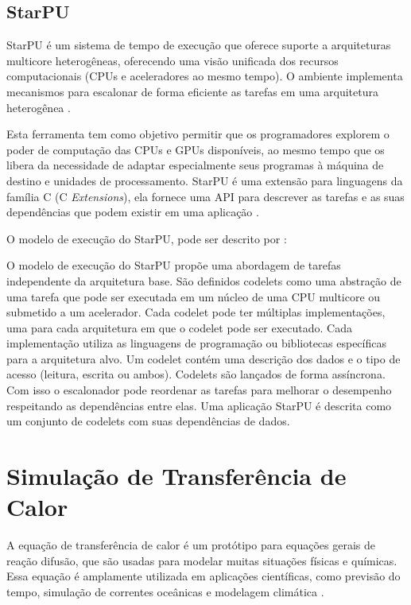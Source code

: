 \subsection{StarPU}
StarPU é um sistema de tempo de execução que oferece suporte a arquiteturas multicore heterogêneas, oferecendo uma visão unificada dos recursos computacionais (CPUs e aceleradores ao mesmo tempo).
O ambiente implementa mecanismos para escalonar de forma eficiente as tarefas em uma arquitetura heterogênea \cite{augonnet2011scheduling}. 

Esta ferramenta tem como objetivo permitir que os programadores explorem o poder de computação das CPUs e GPUs disponíveis, ao mesmo tempo que os libera da necessidade de adaptar especialmente seus programas à máquina de destino e unidades de processamento.
StarPU é uma extensão para linguagens da família C (C \textit{Extensions}), ela fornece uma API para descrever as tarefas e as suas dependências que podem existir em uma aplicação \cite{augonnet2011scheduling}.

\newpage

O modelo de execução do StarPU, pode ser descrito por :

\begin{citacao}
O modelo de execução do StarPU propõe uma abordagem de tarefas independente da arquitetura base.
São definidos codelets como uma abstração de uma tarefa que pode ser executada em um núcleo de uma CPU multicore ou submetido a um acelerador.
Cada codelet pode ter múltiplas implementações, uma para cada arquitetura em que o codelet pode ser executado.
Cada implementação utiliza as linguagens de programação ou bibliotecas específicas para a arquitetura alvo.
Um codelet contém uma descrição dos dados e o tipo de acesso (leitura, escrita ou ambos).
Codelets são lançados de forma assíncrona. Com isso o escalonador pode reordenar as tarefas para melhorar o desempenho respeitando as dependências entre elas.
Uma aplicação StarPU é descrita como um conjunto de codelets com suas dependências de dados. \cite[p.~26]{pinto2011ambientes}
\end{citacao}

\section{Simulação de Transferência de Calor}

A equação de transferência de calor é um protótipo para equações gerais de reação difusão, que são usadas para modelar muitas situações físicas e químicas.
Essa equação é amplamente utilizada em aplicações científicas, como previsão do tempo, simulação de correntes oceânicas e modelagem climática \cite{theinparallel}.

